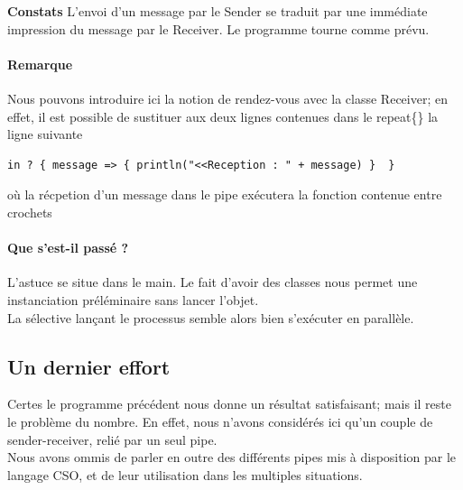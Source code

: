 \documentclass[a4paper,11pt,french]{report}
\begin{document}
\bigskip

\textbf{Constats} L'envoi d'un message par le \textsf{Sender} se traduit par une immédiate impression du message par le \textsf{Receiver}. Le programme tourne comme prévu.

\paragraph{Remarque} Nous pouvons introduire ici la notion de rendez-vous avec la classe Receiver; en effet, il est possible de sustituer aux deux lignes contenues dans le \textsf{repeat\{\}} la ligne suivante
\begin{center}
\begin{verbatim}
in ? { message => { println("<<Reception : " + message) }  }
\end{verbatim}
\end{center}
où la récpetion d'un message dans le pipe exécutera la fonction contenue entre crochets


\paragraph{Que s'est-il passé ?} L'astuce se situe dans le \textsf{main}. Le fait d'avoir des classes nous permet une instanciation préléminaire sans lancer l'objet.\\
La sélective lançant le processus semble alors bien s'exécuter en parallèle.\\

\subsection{Un dernier effort}
Certes le programme précédent nous donne un résultat satisfaisant; mais il reste le problème du nombre. En effet, nous n'avons considérés ici qu'un couple de sender-receiver, relié par un seul pipe.\\
Nous avons ommis de parler en outre des différents pipes mis à disposition par le langage CSO, et de leur utilisation dans les multiples situations.
\end{document}
